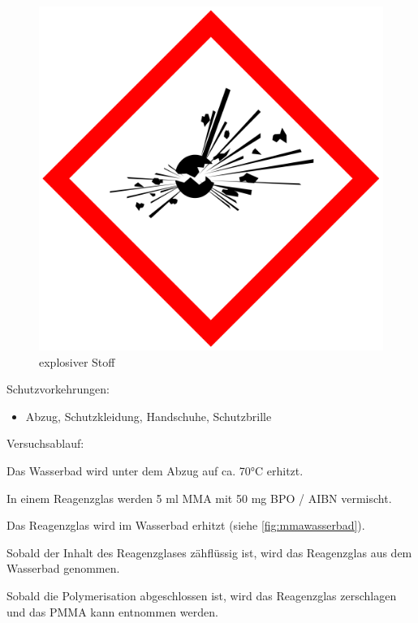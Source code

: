 \begin{figure}[h]
\begin{center}
\begin{minipage}[t]{0.25\textwidth}
\begin{center}
                \includegraphics[height=0.1\textheight]{Bilder/Optische_Wellenleiter_Die_Polymer_Optische_Faser/Material_Polycarbonat/bombe.png}
                \caption[explosiver Stoff \newline \url{https://de.wikipedia.org/wiki/Datei:GHS-pictogram-explos.svg} (zuletzt aufgerufen am 11.10.2015)]{explosiver Stoff}
                \label{fig:bombe}
            \end{center}
        \end{minipage}
    \end{center}
\end{figure}

Schutzvorkehrungen:
\begin{itemize}
    \item Abzug, Schutzkleidung, Handschuhe, Schutzbrille
\end{itemize}

Versuchsablauf:
\begin{enumerate*}
    \item Das Wasserbad wird unter dem Abzug auf ca. 70°C erhitzt.
    \item In einem Reagenzglas werden 5 ml MMA mit 50 mg BPO / AIBN vermischt.
    \item Das Reagenzglas wird im Wasserbad erhitzt (siehe \autoref{fig:mmawasserbad}).
    \item Sobald der Inhalt des Reagenzglases zähflüssig ist, wird das Reagenzglas aus dem Wasserbad genommen.
    \item Sobald die Polymerisation abgeschlossen ist, wird das Reagenzglas zerschlagen und das PMMA kann entnommen werden.
\end{enumerate*}

